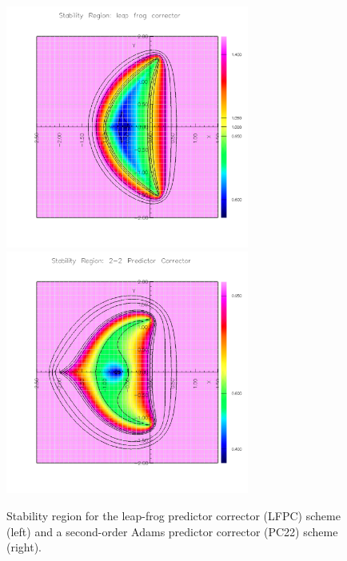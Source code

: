 {
\newcommand{\figWidtha}{8cm}
\begin{figure}[hbt]
  \begin{center}
   \includegraphics[width=\figWidtha]{figures/leapFrogCorrector}
   \includegraphics[width=\figWidtha]{figures/pece22withAxes}
  \end{center}
\caption{Stability region for the leap-frog predictor corrector (LFPC) scheme (left) and a second-order
    Adams predictor corrector (PC22) scheme (right).}\label{fig:stabilityLFPC}
\end{figure}
}

